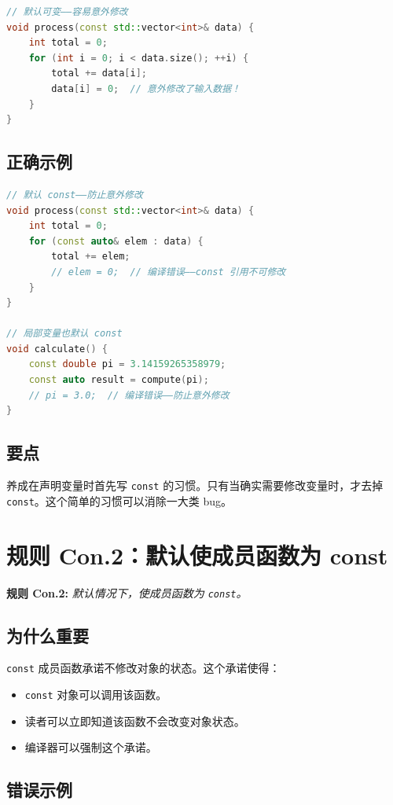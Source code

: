 \begin{lstlisting}[language=C++]
// 默认可变——容易意外修改
void process(const std::vector<int>& data) {
    int total = 0;
    for (int i = 0; i < data.size(); ++i) {
        total += data[i];
        data[i] = 0;  // 意外修改了输入数据！
    }
}
\end{lstlisting}

\subsection{正确示例}

\begin{lstlisting}[language=C++]
// 默认 const——防止意外修改
void process(const std::vector<int>& data) {
    int total = 0;
    for (const auto& elem : data) {
        total += elem;
        // elem = 0;  // 编译错误——const 引用不可修改
    }
}

// 局部变量也默认 const
void calculate() {
    const double pi = 3.14159265358979;
    const auto result = compute(pi);
    // pi = 3.0;  // 编译错误——防止意外修改
}
\end{lstlisting}

\subsection{要点}
养成在声明变量时首先写 \texttt{const} 的习惯。只有当确实需要修改变量时，才去掉 \texttt{const}。这个简单的习惯可以消除一大类 bug。

\section{规则 Con.2：默认使成员函数为 const}

\textbf{规则 Con.2:} \textit{默认情况下，使成员函数为 \texttt{const}。}

\subsection{为什么重要}

\texttt{const} 成员函数承诺不修改对象的状态。这个承诺使得：
\begin{itemize}
  \item \texttt{const} 对象可以调用该函数。
  \item 读者可以立即知道该函数不会改变对象状态。
  \item 编译器可以强制这个承诺。
\end{itemize}

\subsection{错误示例}

